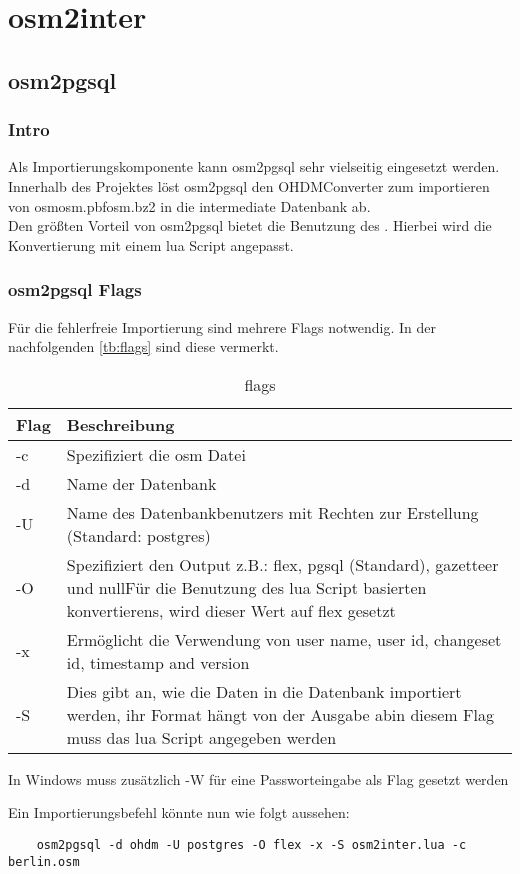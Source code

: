 \part{osm2inter}
\chapter{osm2pgsql}
\section{Intro}
Als Importierungskomponente kann osm2pgsql\cite{osm2pgsql-manual} sehr vielseitig eingesetzt werden. Innerhalb des Projektes löst osm2pgsql den OHDMConverter zum importieren von osm\textbar osm.pbf\textbar osm.bz2 in die intermediate Datenbank ab.\\

Den größten Vorteil von osm2pgsql bietet die Benutzung des . Hierbei wird die Konvertierung mit einem lua Script angepasst.

\section{osm2pgsql Flags}
Für die fehlerfreie Importierung sind mehrere Flags notwendig. In der nachfolgenden \autoref{tb:flags} sind diese vermerkt.
\begin{table}[h]
	\caption{flags}
	\label{tb:flags}
	\renewcommand{\arraystretch}{1.5}
	\begin{tabularx}{\linewidth}{|l|X|}\hline
		Flag & Beschreibung\\\hline
		-c & Spezifiziert die osm Datei\\\hline
		-d & Name der Datenbank \\\hline
		-U & Name des Datenbankbenutzers mit Rechten zur Erstellung (Standard: postgres)\\\hline
		-O & Spezifiziert den Output z.B.: flex, pgsql (Standard), gazetteer und null\newline Für die Benutzung des lua Script basierten konvertierens, wird dieser Wert auf flex gesetzt\\\hline
		-x & Ermöglicht die Verwendung von user name, user id, changeset id, timestamp and version\\\hline
		-S & Dies gibt an, wie die Daten in die Datenbank importiert werden, ihr Format hängt von der Ausgabe ab\newline in diesem Flag muss das lua Script angegeben werden\\\hline		
	\end{tabularx}\vspace{0.5cm}
In Windows muss zusätzlich -W für eine Passworteingabe als Flag gesetzt werden
\end{table}

Ein Importierungsbefehl könnte nun wie folgt aussehen:
\begin{lstlisting}
	osm2pgsql -d ohdm -U postgres -O flex -x -S osm2inter.lua -c berlin.osm
\end{lstlisting}

